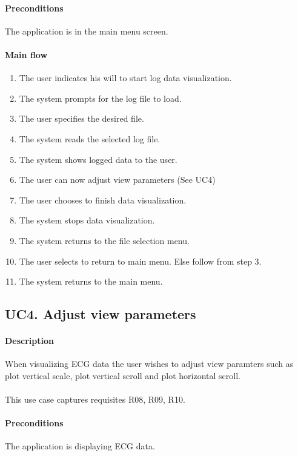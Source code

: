 			\paragraph{Preconditions} The application is in the main menu screen.
			\paragraph{Main flow}
				\begin{enumerate}
				\item The user indicates his will to start log data visualization.
				\item The system prompts for the log file to load.
				\item The user specifies the desired file.
				\item The system reads the selected log file.
				\item The system shows logged data to the user.
				\item The user can now adjust view parameters (See UC4)
				\item The user chooses to finish data visualization.
				\item The system stops data visualization.
				\item The system returns to the file selection menu.
				\item The user selects to return to main menu. Else follow from step 3.
				\item The system returns to the main menu.
				\end{enumerate}

		\subsection{UC4. Adjust view parameters}

			\paragraph{Description} When visualizing ECG data the user wishes to adjust view paramters such as plot vertical scale, plot vertical scroll and plot horizontal scroll.\\
			\\This use case captures requisites R08, R09, R10.

			\paragraph{Preconditions} The application is displaying ECG data.
